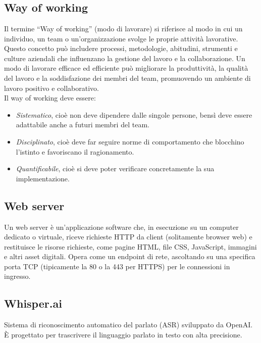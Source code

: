 
\section{}

\hypertarget{sec:way_of_working}{}
\subsection*{Way of working}
Il termine “Way of working” (modo di lavorare) si riferisce al modo in cui un individuo, un team o un’organizzazione svolge le proprie attività lavorative. 
Questo concetto può includere processi, metodologie, abitudini, strumenti e culture aziendali che influenzano la gestione del lavoro e la collaborazione. 
Un modo di lavorare efficace ed efficiente può migliorare la produttività, la qualità del lavoro e la soddisfazione dei membri del team, promuovendo un 
ambiente di lavoro positivo e collaborativo. \\
Il way of working deve essere:
\begin{itemize}
    \item \emph{Sistematico}, cioè non deve dipendere dalle singole persone, bensì deve essere adattabile anche a futuri membri del team.
    \item \emph{Disciplinato}, cioè deve far seguire norme di comportamento che blocchino l'istinto e favoriscano il ragionamento.
    \item \emph{Quantificabile}, cioè si deve poter verificare concretamente la sua implementazione.
\end{itemize}

\hypertarget{sec:web_server}{}
\subsection*{Web server}
Un web server è un'applicazione software che, in esecuzione su un computer dedicato o virtuale, riceve richieste HTTP da client 
(solitamente browser web) e restituisce le risorse richieste, come pagine HTML, file CSS, JavaScript, immagini e altri asset digitali. 
Opera come un endpoint di rete, ascoltando su una specifica porta TCP (tipicamente la 80 o la 443 per HTTPS) per le connessioni in 
ingresso.

\hypertarget{sec:whisper.ai}{}
\subsection*{Whisper.ai}
Sistema di riconoscimento automatico del parlato (ASR) sviluppato da OpenAI.
È progettato per trascrivere il linguaggio parlato in testo con alta precisione.


